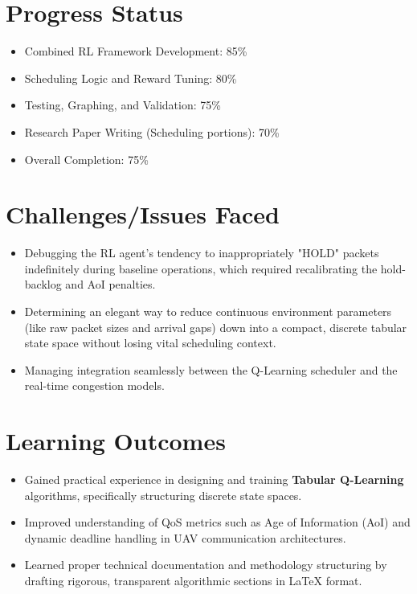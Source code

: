 \documentclass[12pt,a4paper]{article}
\begin{document}
\section{Progress Status}
\begin{itemize}[leftmargin=*]
    \item Combined RL Framework Development: 85\%
    \item Scheduling Logic and Reward Tuning: 80\%
    \item Testing, Graphing, and Validation: 75\%
    \item Research Paper Writing (Scheduling portions): 70\%
    \item Overall Completion: 75\%
\end{itemize}

\section{Challenges/Issues Faced}
\begin{itemize}[leftmargin=*]
    \item Debugging the RL agent's tendency to inappropriately "HOLD" packets indefinitely during baseline operations, which required recalibrating the hold-backlog and AoI penalties.
    \item Determining an elegant way to reduce continuous environment parameters (like raw packet sizes and arrival gaps) down into a compact, discrete tabular state space without losing vital scheduling context.
    \item Managing integration seamlessly between the Q-Learning scheduler and the real-time congestion models.
\end{itemize}

\section{Learning Outcomes}
\begin{itemize}[leftmargin=*]
    \item Gained practical experience in designing and training \textbf{Tabular Q-Learning} algorithms, specifically structuring discrete state spaces.
    \item Improved understanding of QoS metrics such as Age of Information (AoI) and dynamic deadline handling in UAV communication architectures.
    \item Learned proper technical documentation and methodology structuring by drafting rigorous, transparent algorithmic sections in LaTeX format.
\end{itemize}
\end{document}
